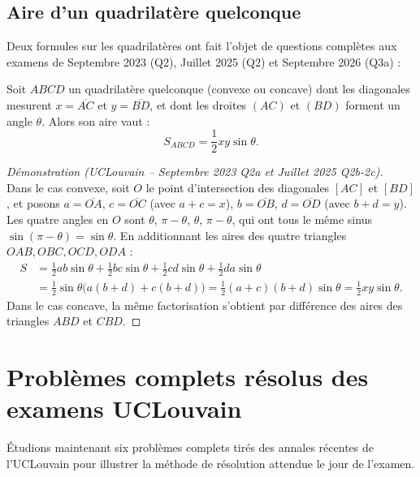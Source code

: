 \subsection{Aire d'un quadrilatère quelconque}

Deux formules sur les quadrilatères ont fait l'objet de questions complètes aux examens de Septembre 2023 (Q2), Juillet 2025 (Q2) et Septembre 2026 (Q3a) :

\begin{theoreme}
Soit $ABCD$ un quadrilatère quelconque (convexe ou concave) dont les diagonales mesurent $x = \overline{AC}$ et $y = \overline{BD}$, et dont les droites $(AC)$ et $(BD)$ forment un angle $\theta$. Alors son aire vaut :
\[
    \boxed{S_{ABCD} = \frac{1}{2} x y \sin\theta}.
\]
\end{theoreme}
\begin{proof}[Démonstration (UCLouvain -- Septembre 2023 Q2a et Juillet 2025 Q2b-2c)]
\mbox{}\\
Dans le cas convexe, soit $O$ le point d'intersection des diagonales $[AC]$ et $[BD]$, et posons $a = \overline{OA}$, $c = \overline{OC}$ (avec $a+c = x$), $b = \overline{OB}$, $d = \overline{OD}$ (avec $b+d = y$). Les quatre angles en $O$ sont $\theta$, $\pi-\theta$, $\theta$, $\pi-\theta$, qui ont tous le même sinus $\sin(\pi-\theta) = \sin\theta$. En additionnant les aires des quatre triangles $OAB, OBC, OCD, ODA$ :
\begin{align*}
    S &= \frac{1}{2}ab\sin\theta + \frac{1}{2}bc\sin\theta + \frac{1}{2}cd\sin\theta + \frac{1}{2}da\sin\theta \\
      &= \frac{1}{2}\sin\theta\bigl(a(b+d) + c(b+d)\bigr) = \frac{1}{2}(a+c)(b+d)\sin\theta = \frac{1}{2}xy\sin\theta.
\end{align*}
Dans le cas concave, la même factorisation s'obtient par différence des aires des triangles $ABD$ et $CBD$.
\end{proof}

\section{Problèmes complets résolus des examens UCLouvain}

Étudions maintenant six problèmes complets tirés des annales récentes de l'UCLouvain pour illustrer la méthode de résolution attendue le jour de l'examen.

